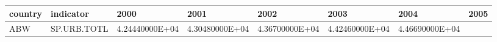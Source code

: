 \documentclass[]{article}
\begin{document}
\begin{longtable}[]{@{}llllllll@{}}
\toprule
\begin{minipage}[b]{0.06\columnwidth}\raggedright
country\strut
\end{minipage} & \begin{minipage}[b]{0.08\columnwidth}\raggedright
indicator\strut
\end{minipage} & \begin{minipage}[b]{0.11\columnwidth}\raggedright
2000\strut
\end{minipage} & \begin{minipage}[b]{0.11\columnwidth}\raggedright
2001\strut
\end{minipage} & \begin{minipage}[b]{0.11\columnwidth}\raggedright
2002\strut
\end{minipage} & \begin{minipage}[b]{0.11\columnwidth}\raggedright
2003\strut
\end{minipage} & \begin{minipage}[b]{0.11\columnwidth}\raggedright
2004\strut
\end{minipage} & \begin{minipage}[b]{0.11\columnwidth}\raggedright
2005\strut
\end{minipage}\tabularnewline
\midrule
\endhead
\begin{minipage}[t]{0.06\columnwidth}\raggedright
ABW\strut
\end{minipage} & \begin{minipage}[t]{0.08\columnwidth}\raggedright
SP.URB.TOTL\strut
\end{minipage} & \begin{minipage}[t]{0.11\columnwidth}\raggedright
4.24440000E+04\strut
\end{minipage} & \begin{minipage}[t]{0.11\columnwidth}\raggedright
4.30480000E+04\strut
\end{minipage} & \begin{minipage}[t]{0.11\columnwidth}\raggedright
4.36700000E+04\strut
\end{minipage} & \begin{minipage}[t]{0.11\columnwidth}\raggedright
4.42460000E+04\strut
\end{minipage} & \begin{minipage}[t]{0.11\columnwidth}\raggedright
4.46690000E+04\strut
\end{minipage} & \begin{minipage}[t]{0.11\columnwidth}\raggedright

\end{minipage}
\end{longtable}
\end{document}
